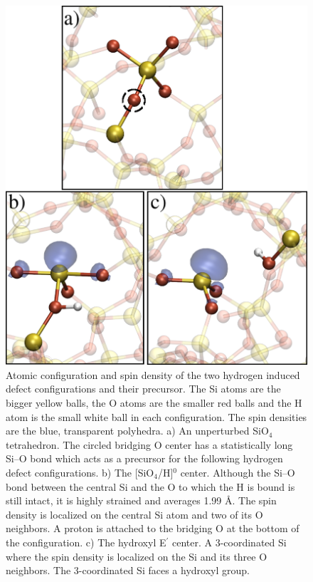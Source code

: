 \documentclass[aps,prb,reprint,superscriptaddress,showpacs]{revtex4-1}
\begin{document}
\label{sec:defect_free}
\begin{figure}[h!]
\includegraphics{hydroxyl_eprime_configurations2.png}
\caption{Atomic configuration and spin density of the two hydrogen induced defect configurations and their precursor. The Si atoms are the bigger yellow balls, the O atoms are the smaller red balls and the H atom is the small white ball in each configuration. The spin densities are the blue, transparent polyhedra. a) An unperturbed SiO$_4$ tetrahedron. The circled bridging O center has a statistically long \mbox{Si--O} bond which acts as a precursor for the following hydrogen defect configurations. b) The [SiO$_4$/H]$^0$ center. Although the \mbox{Si--O} bond between the central Si and the O to which the H is bound is still intact, it is highly strained and averages 1.99 {\AA}. The spin density is localized on the central Si atom and two of its O neighbors. A proton is attached to the bridging O at the bottom of the configuration. c) The hydroxyl E$^\prime$ center. A 3-coordinated Si where the spin density is localized on the Si and its three O neighbors. The 3-coordinated Si faces a hydroxyl group.}
\label{fig:sio2_h_config}
\end{figure}
\end{document}
